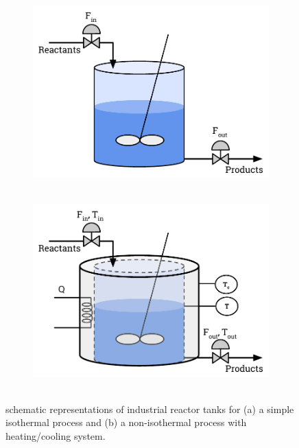 \documentclass[a4paper,11pt]{book}
\numberwithin{figure}{chapter}
\numberwithin{equation}{chapter}
\numberwithin{table}{chapter}
\theoremstyle{definition}
\begin{document}
\begin{figure}[ht] 
	\centering
	\begin{subfigure}{0.49\textwidth}	
		\includegraphics[width=\textwidth]{chapter2/tank01}
		\caption{$\ \ \ \ \ $}	\label{fig:tank01a}
	\end{subfigure}
	\begin{subfigure}{0.49\textwidth}	
		\includegraphics[width=\textwidth]{chapter2/tank02}
		\caption{$\ \ \ \ \ $} \label{fig:tank01b}
	\end{subfigure}
	
	\caption{schematic representations of industrial reactor tanks for (a) a simple isothermal process and (b) a non-isothermal process with heating/cooling system.} 
	\label{fig:tank01}
\end{figure}
\end{document}

